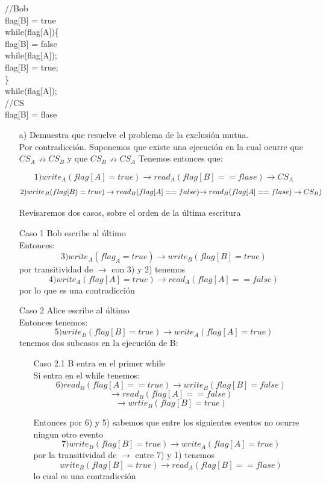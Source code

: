 \documentclass[12pt, letterpaper]{article}
\begin{document}
\begin{itemize}
//Bob\\
flag[B] = true\\
while(flag[A])\{\\
	flag[B] = false\\
	while(flag[A]);\\
	flag[B] = true;\\
	\}\\
while(flag[A]);\\
//CS\\
flag[B] = flase\\
\begin{itemize}
\item[a) ]Demuestra que resuelve el problema de la exclusi\'on mutua.\\
Por contradicción. Suponemos que existe una ejecución en la cual ocurre que $CS_A \nrightarrow CS_B$ y que $CS_B \nrightarrow CS_A$
Tenemos entonces que:

$$1) write_A(flag[A] = true) \rightarrow read_A(flag[B] == flase) \rightarrow CS_A$$
\[2) write_B(flag[B) = true) \rightarrow read_B(flag[A] == false)$$  
$$\rightarrow read_B(flag[A] == flase) \rightarrow CS_B)\]

Revisaremos dos casos, sobre el orden de la última escritura

\item[Caso 1] Bob escribe al último\\
Entonces:
$$3) write_A(flag_A = true) \rightarrow write_B(flag[B] = true)$$
por transitividad de $\rightarrow$ con 3) y 2)
tenemos
$$4) write_A(flag[A] = true) \rightarrow read_A(flag[A] == false) $$
por lo que es una contradicción

\item[Caso 2] Alice escribe al último\\
Entonces tenemos:
$$5) write_B(flag[B] = true) \rightarrow write_A(flag[A] = true) $$
tenemos dos subcasos en la ejecución de B:
\begin{itemize}
\item[Caso 2.1] B entra en el primer while\\
Si entra en el while tenemos:
$$ 6) read_B(flag[A] == true) \rightarrow write_B(flag[B] = false)$$
$$ \rightarrow read_B(flag[A] == false)$$
$$ \rightarrow wrtie_B(flag[B] = true)$$

Entonces por 6) y 5) sabemos que entre los siguientes eventos no ocurre ningun otro evento
$$7) write_B(flag[B] = true) \rightarrow write_A(flag[A] = true)$$
por la transitividad de $\rightarrow$ entre 7) y 1) tenemos
$$write_B(flag[B] = true) \rightarrow read_A(flag[B] == flase)$$
lo cual es una contradicción


\end{itemize}
\end{itemize}
\end{itemize}
\end{document}
